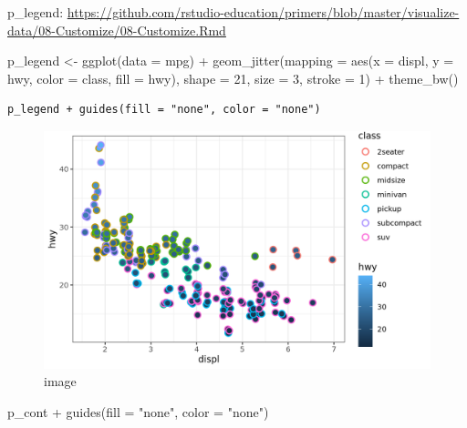 \documentclass[
]{article}
\newenvironment{Shaded}{\begin{snugshade}}{\end{snugshade}}
\newcommand{\AttributeTok}[1]{\textcolor[rgb]{0.77,0.63,0.00}{#1}}
\newcommand{\DecValTok}[1]{\textcolor[rgb]{0.00,0.00,0.81}{#1}}
\newcommand{\FunctionTok}[1]{\textcolor[rgb]{0.00,0.00,0.00}{#1}}
\newcommand{\NormalTok}[1]{#1}
\newcommand{\OtherTok}[1]{\textcolor[rgb]{0.56,0.35,0.01}{#1}}
\newcommand{\SpecialCharTok}[1]{\textcolor[rgb]{0.00,0.00,0.00}{#1}}
\newcommand{\StringTok}[1]{\textcolor[rgb]{0.31,0.60,0.02}{#1}}
\begin{document}
p\_legend:
\url{https://github.com/rstudio-education/primers/blob/master/visualize-data/08-Customize/08-Customize.Rmd}

\begin{Shaded}
\begin{Highlighting}[]
\NormalTok{p\_legend }\OtherTok{\textless{}{-}} \FunctionTok{ggplot}\NormalTok{(}\AttributeTok{data =}\NormalTok{ mpg) }\SpecialCharTok{+} 
  \FunctionTok{geom\_jitter}\NormalTok{(}\AttributeTok{mapping =} \FunctionTok{aes}\NormalTok{(}\AttributeTok{x =}\NormalTok{ displ, }\AttributeTok{y =}\NormalTok{ hwy, }\AttributeTok{color =}\NormalTok{ class, }\AttributeTok{fill =}\NormalTok{ hwy), }
              \AttributeTok{shape =} \DecValTok{21}\NormalTok{, }\AttributeTok{size =} \DecValTok{3}\NormalTok{, }\AttributeTok{stroke =} \DecValTok{1}\NormalTok{) }\SpecialCharTok{+}
  \FunctionTok{theme\_bw}\NormalTok{()}
\end{Highlighting}
\end{Shaded}

\begin{verbatim}
p_legend + guides(fill = "none", color = "none")
\end{verbatim}

\begin{figure}
\centering
\includegraphics{data/p_legend.png}
\caption{image}
\end{figure}

\begin{Shaded}
\begin{Highlighting}[]
\NormalTok{p\_cont }\SpecialCharTok{+} \FunctionTok{guides}\NormalTok{(}\AttributeTok{fill =} \StringTok{"none"}\NormalTok{, }\AttributeTok{color =} \StringTok{"none"}\NormalTok{)}
\end{Highlighting}
\end{Shaded}
\end{document}
